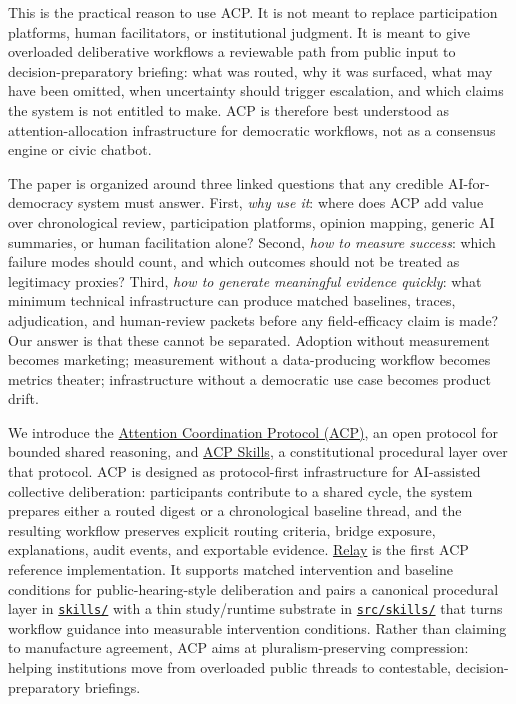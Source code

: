 \documentclass[11pt]{article}
\newcommand{\repobase}{https://github.com/davidkimai/acp}
\newcommand{\repodir}[2]{\href{\repobase/tree/main/#1}{\nolinkurl{#2}}}
\begin{document}
\vspace{0.1in}
This is the practical reason to use ACP. It is not meant to replace participation platforms, human facilitators, or institutional judgment. It is meant to give overloaded deliberative workflows a reviewable path from public input to decision-preparatory briefing: what was routed, why it was surfaced, what may have been omitted, when uncertainty should trigger escalation, and which claims the system is not entitled to make. ACP is therefore best understood as attention-allocation infrastructure for democratic workflows, not as a consensus engine or civic chatbot.

\vspace{0.1in}
The paper is organized around three linked questions that any credible AI-for-democracy system must answer. First, \emph{why use it}: where does ACP add value over chronological review, participation platforms, opinion mapping, generic AI summaries, or human facilitation alone? Second, \emph{how to measure success}: which failure modes should count, and which outcomes should not be treated as legitimacy proxies? Third, \emph{how to generate meaningful evidence quickly}: what minimum technical infrastructure can produce matched baselines, traces, adjudication, and human-review packets before any field-efficacy claim is made? Our answer is that these cannot be separated. Adoption without measurement becomes marketing; measurement without a data-producing workflow becomes metrics theater; infrastructure without a democratic use case becomes product drift.

\vspace{0.1in}
We introduce the \href{https://github.com/davidkimai/acp/tree/main/protocol}{Attention Coordination Protocol (ACP)}, an open protocol for bounded shared reasoning, and \href{https://github.com/davidkimai/acp/tree/main/skills}{ACP Skills}, a constitutional procedural layer over that protocol. ACP is designed as protocol-first infrastructure for AI-assisted collective deliberation: participants contribute to a shared cycle, the system prepares either a routed digest or a chronological baseline thread, and the resulting workflow preserves explicit routing criteria, bridge exposure, explanations, audit events, and exportable evidence. \href{https://github.com/davidkimai/acp/blob/main/docs/specs/RELAY_REFERENCE_IMPLEMENTATION_SPEC.md}{Relay} is the first ACP reference implementation. It supports matched intervention and baseline conditions for public-hearing-style deliberation and pairs a canonical procedural layer in \repodir{skills}{skills/} with a thin study/runtime substrate in \repodir{src/skills}{src/skills/} that turns workflow guidance into measurable intervention conditions. Rather than claiming to manufacture agreement, ACP aims at pluralism-preserving compression: helping institutions move from overloaded public threads to contestable, decision-preparatory briefings.
\end{document}
